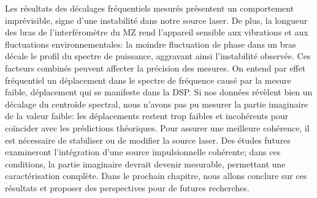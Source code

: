 \begin{onehalfspace}
    Les résultats des décalages fréquentiels mesurés présentent un 
    comportement imprévisible, signe d’une instabilité dans notre 
    source laser. De plus, la longueur des bras de l’interféromètre 
    du MZ rend l’appareil sensible aux vibrations et aux 
    fluctuations environnementales: la moindre fluctuation de 
    phase dans un bras décale le profil du spectre de puissance, 
    aggravant ainsi l’instabilité observée. Ces facteurs combinés 
    peuvent affecter la précision des mesures.
    On entend par effet fréquentiel un déplacement dans le spectre 
    de fréquence causé par la mesure faible, déplacement qui se 
    manifeste dans la DSP. Si nos données révèlent bien un décalage 
    du centroïde spectral, nous n’avons pas pu mesurer la partie 
    imaginaire de la valeur faible: les déplacements restent trop 
    faibles et incohérents pour coïncider avec les prédictions 
    théoriques.
    Pour assurer une meilleure cohérence, il est nécessaire de 
    stabiliser ou de modifier la source laser. Des études futures 
    examineront l’intégration d’une source impulsionnelle 
    cohérente; dans ces conditions, la partie imaginaire devrait 
    devenir mesurable, permettant une caractérisation complète. 
    Dans le prochain chapitre, nous allons 
    conclure sur ces résultats et proposer des perspectives pour de futures 
    recherches.


\end{onehalfspace}

